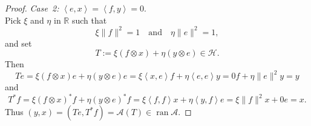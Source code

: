 \documentclass[10pt,a4paper]{amsart}
\newcommand{\RR}{\ensuremath{\mathbb R}}
\providecommand{\mA}{\mathcal{A}}
\providecommand{\mH}{\mathcal{H}}
\newcommand{\ran}{\ensuremath{\operatorname{ran}}}
\newcommand{\scal}[2]{\left\langle{#1},{#2}  \right\rangle}
\begin{document}
\begin{proof}
{\it Case~2:} $\scal{e}{x}=\scal{f}{y}=0$.\\
Pick $\xi$ and $\eta$ in $\RR$ such that 
\begin{equation}
\xi \|f\|^2=1
\quad\text{and}\quad 
\eta\|e\|^2=1,
\end{equation}
and set 
\begin{equation}
T := \xi(f\otimes x) + \eta(y\otimes e)\in\mH.
\end{equation}
Then
\begin{equation}
Te = \xi(f\otimes x)e + \eta(y\otimes e)e
= \xi\scal{x}{e}f + \eta\scal{e}{e}y = 0f + \eta\|e\|^2y = y
\end{equation}
and 
\begin{equation}
T^*f = \xi(f\otimes x)^*f + \eta(y\otimes e)^*f
= \xi\scal{f}{f}x + \eta\scal{y}{f}e = \xi\|f\|^2x + 0e = x.
\end{equation}
Thus 
$(y,x)=(Te,T^*f)=\mA(T)\in\ran\mA$. 
\end{proof}
\end{document}
